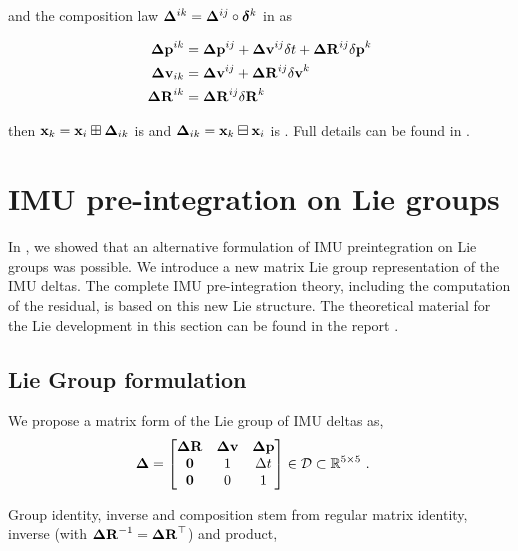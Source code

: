 and the composition law ${\bm \Delta}^{ik}={\bm \Delta}^{ij}\circ\bm\delta^k$ in  as

\begin{align} \label{eq:composition_delta}
    \begin{split}
    {\bm \Delta {\bf p}}^{ik} 
    &= {\bm \Delta {\bf p}}^{ij} + {\bm \Delta {\bf v}}^{ij}\delta t + {\bm \Delta {\bf R}}^{ij}{\delta{\bf p}}^{k} \\
    {\bm \Delta {\bf v}}_{ik} 
    &= {\bm \Delta {\bf v}}^{ij} + {\bm \Delta {\bf R}}^{ij}{\delta{\bf v}}^{k} \\
    {\bm \Delta {\bf R}}^{ik} 
    &= {\bm \Delta {\bf R}}^{ij}{\delta{\bf R}}^{k} 
    \end{split}
\end{align}

then ${\bf x}_k={\bf x}_i\boxplus{\bm \Delta}_{ik}$ is \cite[eq.~32]{forster2017-TRO} and ${\bm \Delta}_{ik}={\bf x}_k\boxminus{\bf x}_i$ is \cite[eq.~33]{forster2017-TRO}. 
Full details can be found in \cite[Section 3.4]{atchuthan-18-thesis}.



%
%
%
%
\section{IMU pre-integration on Lie groups}
In \cite{fourmy2019absolute}, we showed that an alternative formulation of IMU preintegration on Lie groups was possible.
We introduce a new matrix Lie group representation of
the IMU deltas. The complete IMU pre-integration theory,
including the computation of the residual, is based on this
new Lie structure. The theoretical material for the Lie
development in this section can be found in the report \cite{sola2018micro}.


\subsection{Lie Group formulation}

We propose a matrix form of the Lie group of IMU deltas as,
%
\begin{align}\label{equ:delta_Lie}
{{\bm \Delta}} &= 
\begin{bmatrix}
{\bm \Delta {\bf R}} & {\bm \Delta {\bf v}} & {\bm \Delta {\bf p}} \\
\bf0 & 1 & \Delta t \\
\bf0 & 0 & 1
\end{bmatrix} \in \mathcal{D} \subset {\mathbb R}^{5\times 5}
~.
\end{align}

Group identity, inverse and composition stem from regular matrix identity, inverse (with ${\bm \Delta {\bf R}}^{-1}={\bm \Delta {\bf R}}^{\top}$) and product,


